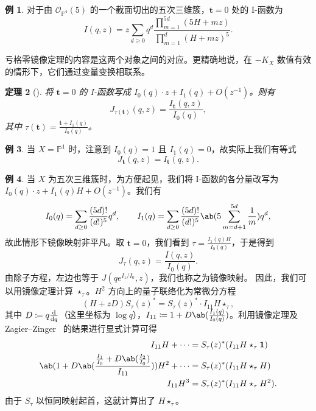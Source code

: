 \documentclass{amsart}
\newtheorem{thm}{定理}[section]
\theoremstyle{definition}
\newtheorem{exm}[thm]{例}
\theoremstyle{remark}
\theoremstyle{plain}
\theoremstyle{definition}
\theoremstyle{remark}
\renewcommand{\P}{\mathbb{P}}
\newcommand{\mc}[1]{\mathcal{#1}}
\newcommand{\mbf}[1]{\mathbf{#1}}
\newcommand{\1}{\mathbf{1}}
\newcommand{\2}{\mathbf{2}}
\newcommand{\3}{\mathbf{3}}
\begin{document}
\begin{exm}
    对于由 \(\mc{O}_{\P^4}(5)\) 的一个截面切出的五次三维簇，\(\mbf{t} = 0\) 处的 I-函数为
    \[ I(q,z) = z \sum_{d \geq 0} q^d \frac{\prod_{m=1}^{5d}(5H+mz)}{\prod_{m=1}^d (H+mz)^5}. \]
\end{exm}

亏格零镜像定理的内容是这两个对象之间的对应。更精确地说，在 \(-K_X\) 数值有效的情形下，它们通过变量变换相联系。

\begin{thm}[{\cite{Givental1998,LLY1997}}]
    将 \(\mbf{t} = 0\) 的 I-函数写成 \(I_0(q) \cdot z + I_1(q) + O(z^{-1})\)。则有
    \[
        J_{\tau(\mbf{t})}(q,z) = \frac{I_{\mbf{t}}(q,z)}{I_0(q)},
    \]
    其中 \(\tau(\mbf{t}) = \frac{\mbf{t} + I_1(q)}{I_0(q)}\)。
\end{thm}

\begin{exm}
    当 \(X = \P^1\) 时，注意到 \(I_0(q) = 1\) 且 \(I_1(q) = 0\)，故实际上我们有等式
    \[ J_{\mbf{t}}(q,z) = I_{\mbf{t}}(q,z). \]
\end{exm}

\begin{exm}
    当 \(X\) 为五次三维簇时，为方便起见，我们将 I-函数的各分量改写为 \(I_0(q) \cdot z + I_1(q)H + O(z^{-1})\)。我们有
    \[ I_0(q) = \sum_{d \geq 0} \frac{(5d)!}{(d!)^5} q^d, \qquad I_1(q) = \sum_{d \geq 0} \frac{(5d)!}{(d!)^5} \ab(5\sum_{m=d+1}^{5d} \frac{1}{m}) q^d, \]
    故此情形下镜像映射非平凡。取 \(\mbf{t} = 0\)，我们看到 \(\tau = \frac{I_1(q)H}{I_0(q)}\)，于是得到
    \[ J_{\tau}(q,z) = \frac{I(q,z)}{I_0(q)}. \]
    由除子方程，左边也等于 \(J(qe^{I_1/I_0}, z)\)，我们也称之为镜像映射。
    因此，我们可以用镜像定理计算 $\star_{\tau}$。\(H^2\) 方向上的量子联络化为常微分方程
    \[ (H+zD) S_{\tau}(z)^* = S_{\tau}(z)^* \cdot I_{11} H \star_{\tau}, \]
    其中 $D \coloneqq q \odv{}{q}$（这里坐标为 $\log q$），$I_{11} \coloneqq 1 + D \ab(\frac{I_1(q)}{I_0(q)})$。利用镜像定理及 Zagier--Zinger~\cite{ZagierZinger2008} 的结果进行显式计算可得
    \begin{align*}
        I_{11} H + \cdots &= S_{\tau}(z)^* (I_{11} H \star_{\tau} \1) \\
        \ab( 1 + D\ab(\frac{\frac{I_1}{I_0} + D \ab(\frac{I_2}{I_0})}{I_{11}}) ) H^2 + \cdots &= S_{\tau}(z)^* (I_{11} H \star_{\tau} H) \\
        I_{11} H^3 &= S_{\tau}(z)^* (I_{11}H \star_{\tau} H^2).
    \end{align*}
    由于 $S_{\tau}$ 以恒同映射起首，这就计算出了 $H \star_{\tau}$。
\end{exm}
\end{document}
